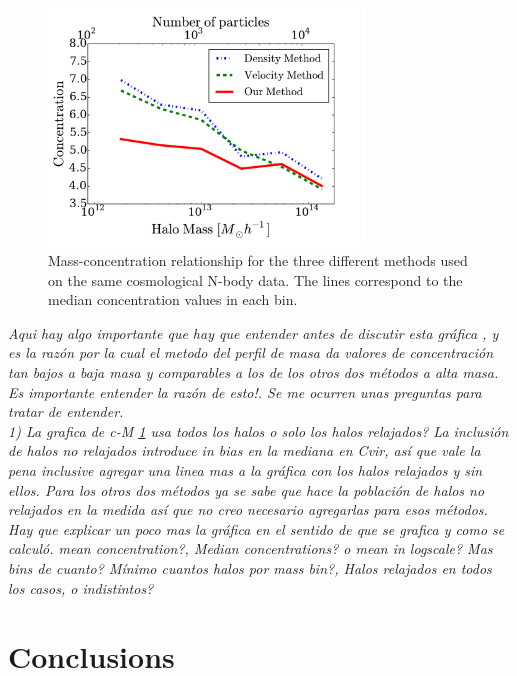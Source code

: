 \documentclass[a4,useAMS,usenatbib,usegraphicx]{mn2e}
\begin{document}
\begin{figure}
\begin{center}
  \includegraphics[width=0.75\textwidth]{concentration.pdf}
\end{center}
\caption{Mass-concentration relationship for the three different
  methods used on the same cosmological N-body data. 
  The lines correspond to the median concentration values in each bin.
  \label{fig:concentration}}
\end{figure}


{\em Aqui hay algo importante que hay que entender antes de discutir
  esta gráfica , y es la razón por la cual el metodo del perfil de
  masa da valores de concentración tan bajos a baja masa y comparables
  a los de los otros dos métodos a alta masa. Es importante entender
  la razón de esto!.  Se me ocurren unas preguntas para tratar de
  entender. \\ 1) La grafica de c-M \ref{fig:concentration} usa todos
  los halos o solo los halos relajados? La inclusión de halos no
  relajados introduce in bias en la mediana en Cvir, así que vale la
  pena inclusive agregar una linea mas a la gráfica con los halos
  relajados y sin ellos. Para los otros dos métodos ya se sabe que
  hace la población de halos no relajados en la medida así que no creo
  necesario agregarlas para esos métodos. \\ Hay que explicar un poco
  mas la gráfica en el sentido de que se grafica y como se
  calculó. mean concentration?, Median concentrations? o mean in
  logscale?  Mas bins de cuanto? Mínimo cuantos halos por mass bin?,
  Halos relajados en todos los casos, o indistintos?}



\section{Conclusions}
\label{sec:conclusions}
\end{document}
